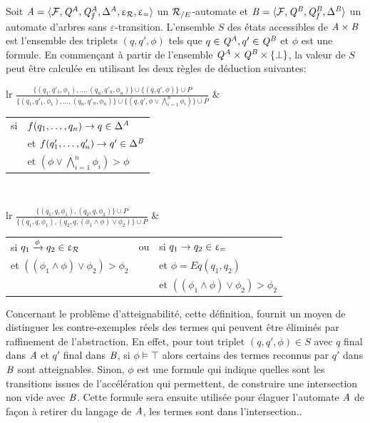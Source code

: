 \begin{definition}
  \label{def:reachable-states}
  Soit $\mathit A =\langle \mathcal{F}, \mathit Q^\mathit A,\mathit Q^\mathit A_f,\Delta^\mathit A, \upvarepsilon_{\mathcal R}, \upvarepsilon_{=} \rangle$ un ${\mathcal R_{/E}}$-automate et
  $\mathit B=\langle \mathcal{F}, \mathit Q^\mathit B,\mathit Q^\mathit B_f,\Delta^\mathit B \rangle$ un automate d'arbres sans $\varepsilon$-transition.
  L'ensemble $S$ des états accessibles de $\mathit A \times \mathit B$ est l'ensemble des triplets $(q,q',\phi)$ tels que
  $q\in\mathit Q^A,q'\in\mathit Q^\mathit B$ et $\phi$ est une formule. En commençant à partir de l'ensemble  $\mathit Q^A
  \times \mathit Q^\mathit B \times \{ \bot\}$, la valeur de $S$ peut être calculée en utilisant les deux règles de déduction
  suivantes:

\medskip
\noindent
{\footnotesize
  \centering
  \hspace*{-1.25cm}
  \begin{tabular}{lr}
    $\displaystyle\frac
    {\{(q_1,q'_1, \phi_1), \ldots, (q_n,q'_n,\phi_n)\} \cup \{(q,q',\phi)\} \cup P}
    {\{(q_1,q'_1,\phi_1), \ldots, (q_n,q'_n,\phi_n)\} \cup \{(q,q',\phi \vee \bigwedge_{i=1}^n \phi_i)\}
      \cup P}$ &  
    \quad
    \begin{tabular}{cl}
      si &$f(q_1, \ldots, q_n) \rightarrow q \in \Delta^\mathit A$  \\ 
      &et $f(q'_1, \ldots, q'_n) \rightarrow q' \in \Delta^\mathit B$  \\ 
      &et $(\phi \vee \bigwedge_{i=1}^n \phi_i) > \phi$ 
    \end{tabular}
  \end{tabular}\\
  \vspace*{1cm}
  \begin{tabular}{lr}
    $\displaystyle\frac   
    {\{(q_1,q,\phi_1), (q_2,q,\phi_2)\} \cup P}
    {\{(q_1,q,\phi_1), (q_2,q,(\phi_1 \wedge \phi) \vee \phi_2)\} \cup P}$
    &
    \begin{tabular}{lcl}
      si $q_1 \xrightarrow{\phi} q_2 \in \upvarepsilon_{\mathcal R}$ &ou& si $q_1 \rightarrow q_2 \in \upvarepsilon_{=}$ \\
      et $((\phi_1 \wedge \phi) \vee \phi_2) > \phi_2$ && et $\phi=Eq(q_1,q_2)$ \\
      && et $((\phi_1 \wedge \phi) \vee \phi_2) > \phi_2$ 
    \end{tabular}
  \end{tabular}
}
\end{definition}

Concernant le problème d'atteignabilité, cette définition, fournit un moyen
de distinguer les contre-exemples réels des termes qui peuvent être éliminés
par raffinement de l'abstraction. En effet, pour tout triplet $(q,q',\phi)\in S$ avec $q$ final dans $\mathit A$ et $q'$ final
dans $\mathit B$, si $\phi \models \top$ alors certains des termes reconnus par $q'$ dans $\mathit B$ sont atteignables. 
Sinon, $\phi$ est une formule qui indique quelles sont les transitions issues de l'accélération qui permettent,
de construire une intersection non vide avec $\mathit B$. Cette formule sera ensuite utilisée pour élaguer l'automate $\mathit A$
de façon à retirer du langage de $\mathit A$, les termes sont dans l'intersection..

